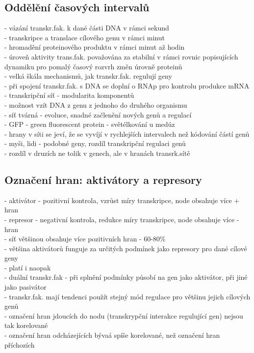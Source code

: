 \documentclass[11pt,a4paper]{report}
\begin{document}
\subsection{Oddělění časových intervalů}
- vázání transkr.fak. k dané části DNA v rámci sekund\\
- transkripce a translace cílového genu v rámci minut\\
- hromadění proteinového produktu v rámci minut až hodin\\
- úroveň aktivity trans.fak. považována za stabilní v rámci rovnic popisujících dynamiku pro pomalý časový rozvrh změn úrovně proteinů\\
- velká škála mechanismů, jak transkr.fak. regulují geny\\
- při spojení transkr.fak. s DNA se doplní o RNAp pro kontrolu produkce mRNA\\
- transkripční síť - modularita komponentů\\
\indent - možnost vzít DNA z genu z jednoho do druhého organismu\\
\indent \indent - síť tvárná - evoluce, snadné začlenění nových genů a regulací\\
- GFP - green fluorescent protein - světélkování u medúz\\
- hrany v síti se jeví, že se vyvíjí v rychlejších intervalech než kódování částí genů\\
\indent - myši, lidi - podobné geny, rozdíl transkripční regulaci genů\\
\indent \indent - rozdíl v druzích ne tolik v genech, ale v hranách transrk.sítě\\

\subsection{Označení hran: aktivátory a represory}
- aktivátor - pozitivní kontrola, vzrůst míry transkripce, node obsahuje více + hran\\
- represor - negativní kontrola, redukce míry transkripce, node obsahuje více - hran\\
- síť většinou obsahuje více pozitivních hran - 60-80$\%$\\
- většina aktivátorů funguje za určitých podmínek jako represory pro dané cílové geny\\
\indent - platí i naopak\\
- duální transkr.fak - při splnění podmínky působí na gen jako aktivátor, při jiné jako pasivátor\\
- transkr.fak. mají tendenci použít stejný mód regulace pro většinu jejich cílových genů\\
\indent - označení hran jdoucích do nodu (transkrypční interakce regulující gen) nejsou tak korelované\\
- označení hran odcházejících bývaá spíše korelované, než označení hran příchozích\\
\end{document}
